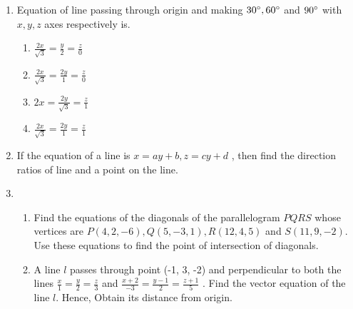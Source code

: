 \documentclass{article}
\begin{document}
\begin{enumerate}
\item Equation of line passing through origin and making $ 30{\degree}, 60{\degree} $ and $ 90{\degree} $ 
	with $ x,y,z $ axes respectively is.
		\begin{enumerate}
			\item $ \frac{2x}{\sqrt{3}} = \frac{y}{2} = \frac{z}{0}  $
			\item $ \frac{2x}{\sqrt{3}} = \frac{2y}{1} = \frac{z}{0}  $
			\item $ 2x = \frac{2y}{\sqrt{3}} = \frac{z}{1}  $
			\item $ \frac{2x}{\sqrt{3}} = \frac{2y}{1} = \frac {z}{1} $
		\end{enumerate}
	\item If the equation of a line is $ x = ay + b, z = cy + d $ , then find the direction ratios of 
		line and a point on the line.
	\item 
		\begin{enumerate}
			\item Find the equations of the diagonals of the parallelogram $ PQRS $ whose 
				vertices are $ P(4, 2, -6),Q(5, -3, 1), R(12, 4, 5) $ and $ S(11, 9, -2) $. 
				Use these equations to find the point of intersection of diagonals.
	\item A line $ l $ passes through point (-1, 3, -2) and perpendicular to both the lines 
		$ \frac{x}{1} = \frac{y}{2} = \frac{z}{3} $ and $ \frac{x+2}{-3} = \frac{y-1}{2} = \frac{z+1}{5} $
		. Find the vector equation of the line $ l $. Hence, Obtain its distance from origin. 
		\end{enumerate}
\end{enumerate}
\end{document}
